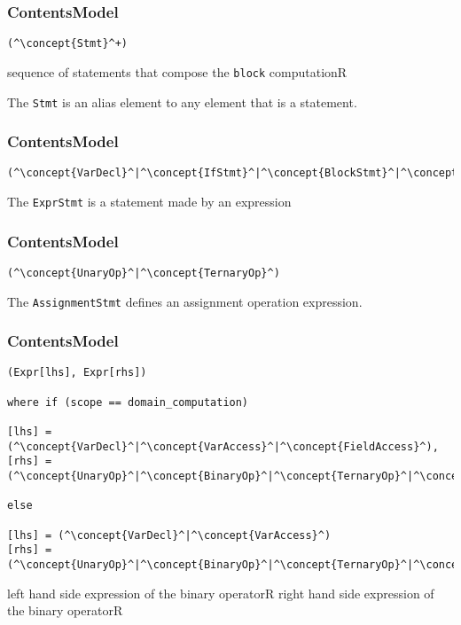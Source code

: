 \subsubsection*{ContentsModel}{}

\begin{lstlisting}[style=default]
(^\concept{Stmt}^+)
\end{lstlisting}

\begin{HIRChildElements}
	{sequence of statements that compose the {\tt block} computation}{R}
\end{HIRChildElements}

The {\tt Stmt} is an alias element to any element that is a statement.

\subsubsection*{ContentsModel}{}

\begin{lstlisting}[style=default]
(^\concept{VarDecl}^|^\concept{IfStmt}^|^\concept{BlockStmt}^|^\concept{IfStmt}^|^\concept{ExprStmt}^)
\end{lstlisting}

The {\tt ExprStmt} is a statement made by an expression

\subsubsection*{ContentsModel}{}

\begin{lstlisting}[style=default]
(^\concept{UnaryOp}^|^\concept{TernaryOp}^)
\end{lstlisting}



The {\tt AssignmentStmt} defines an assignment operation expression.

\subsubsection*{ContentsModel}{}

\begin{lstlisting}[style=default]
(Expr[lhs], Expr[rhs])

where if (scope == domain_computation)

[lhs] = (^\concept{VarDecl}^|^\concept{VarAccess}^|^\concept{FieldAccess}^),
[rhs] =	(^\concept{UnaryOp}^|^\concept{BinaryOp}^|^\concept{TernaryOp}^|^\concept{Literal}^|^\concept{FieldAccess}^)

else

[lhs] = (^\concept{VarDecl}^|^\concept{VarAccess}^)
[rhs] =	(^\concept{UnaryOp}^|^\concept{BinaryOp}^|^\concept{TernaryOp}^|^\concept{Literal}^)
\end{lstlisting}


\begin{HIRChildElements}
	\HIRElementDef{[lhs]}
	{left hand side expression of the binary operator}{R}
	\HIRElementDef{[rhs]}
	{right hand side expression of the binary operator}{R}
\end{HIRChildElements}
